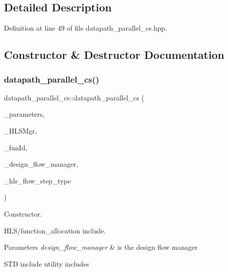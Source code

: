 \subsection{Detailed Description}


Definition at line 49 of file datapath\+\_\+parallel\+\_\+cs.\+hpp.



\subsection{Constructor \& Destructor Documentation}
\mbox{\label{classdatapath__parallel__cs_ae38b414a0819ea8ddd0ed31d7f10e3b7}} 
\subsubsection{\texorpdfstring{datapath\+\_\+parallel\+\_\+cs()}{datapath\_parallel\_cs()}}
{\footnotesize\ttfamily datapath\+\_\+parallel\+\_\+cs\+::datapath\+\_\+parallel\+\_\+cs (\begin{DoxyParamCaption}\item[{const \hyperlink{Parameter_8hpp_a37841774a6fcb479b597fdf8955eb4ea}{Parameter\+Const\+Ref}}]{\+\_\+parameters,  }\item[{const \hyperlink{hls__manager_8hpp_acd3842b8589fe52c08fc0b2fcc813bfe}{H\+L\+S\+\_\+manager\+Ref}}]{\+\_\+\+H\+L\+S\+Mgr,  }\item[{unsigned int}]{\+\_\+fun\+Id,  }\item[{const Design\+Flow\+Manager\+Const\+Ref}]{\+\_\+design\+\_\+flow\+\_\+manager,  }\item[{const \hyperlink{hls__step_8hpp_ada16bc22905016180e26fc7e39537f8d}{H\+L\+S\+Flow\+Step\+\_\+\+Type}}]{\+\_\+hls\+\_\+flow\+\_\+step\+\_\+type }\end{DoxyParamCaption})}



Constructor. 

H\+L\+S/function\+\_\+allocation include.


\begin{DoxyParams}{Parameters}
{\em design\+\_\+flow\+\_\+manager} & is the design flow manager\\
\hline
\end{DoxyParams}
S\+TD include utility includes 

